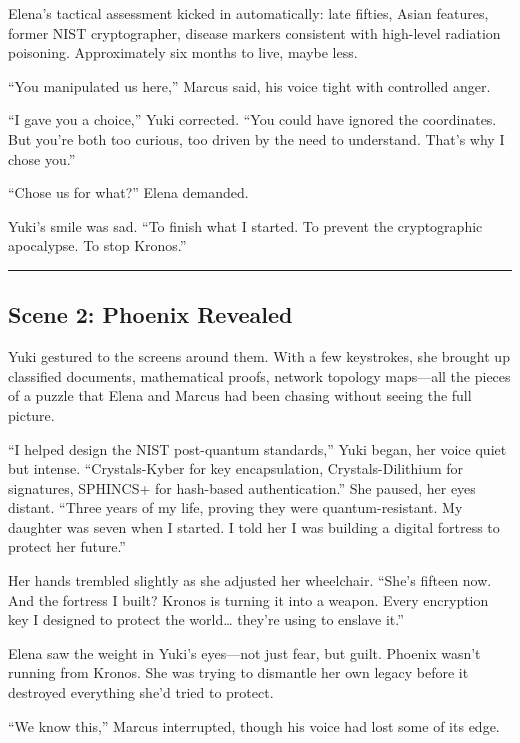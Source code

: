 Elena's tactical assessment kicked in automatically: late fifties, Asian
features, former NIST cryptographer, disease markers consistent with
high-level radiation poisoning. Approximately six months to live, maybe
less.

``You manipulated us here,'' Marcus said, his voice tight with
controlled anger.

``I gave you a choice,'' Yuki corrected. ``You could have ignored the
coordinates. But you're both too curious, too driven by the need to
understand. That's why I chose you.''

``Chose us for what?'' Elena demanded.

Yuki's smile was sad. ``To finish what I started. To prevent the
cryptographic apocalypse. To stop Kronos.''

\begin{center}\rule{0.5\linewidth}{0.5pt}\end{center}

\hypertarget{scene-2-phoenix-revealed}{%
\subsection{Scene 2: Phoenix Revealed}\label{scene-2-phoenix-revealed}}

Yuki gestured to the screens around them. With a few keystrokes, she
brought up classified documents, mathematical proofs, network topology
maps---all the pieces of a puzzle that Elena and Marcus had been chasing
without seeing the full picture.

``I helped design the NIST post-quantum standards,'' Yuki began, her
voice quiet but intense. ``Crystals-Kyber for key encapsulation,
Crystals-Dilithium for signatures, SPHINCS+ for hash-based
authentication.'' She paused, her eyes distant. ``Three years of my
life, proving they were quantum-resistant. My daughter was seven when I
started. I told her I was building a digital fortress to protect her
future.''

Her hands trembled slightly as she adjusted her wheelchair. ``She's
fifteen now. And the fortress I built? Kronos is turning it into a
weapon. Every encryption key I designed to protect the world\ldots{}
they're using to enslave it.''

Elena saw the weight in Yuki's eyes---not just fear, but guilt. Phoenix
wasn't running from Kronos. She was trying to dismantle her own legacy
before it destroyed everything she'd tried to protect.

``We know this,'' Marcus interrupted, though his voice had lost some of
its edge.


